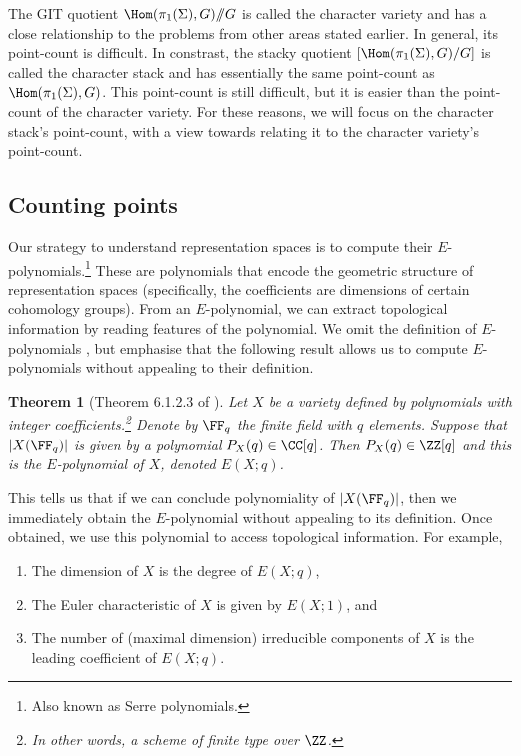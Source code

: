 \documentclass{amsart}
\theoremstyle{plain}
\newtheorem{thm}{Theorem}
\theoremstyle{definition}
\theoremstyle{remark}
\begin{document}
The GIT quotient $\Hom(\pi_1(\Sigma),G)/\!\!/G$ is called the character variety and has a close relationship to the problems from other areas stated earlier. In general, its point-count is difficult. In constrast, the stacky quotient $[\Hom(\pi_1(\Sigma),G)/G]$ is called the character stack and has essentially the same point-count as $\Hom(\pi_1(\Sigma),G)$. This point-count is still difficult, but it is easier than the point-count of the character variety. For these reasons, we will focus on the character stack's point-count, with a view towards relating it to the character variety's point-count.








\subsection*{Counting points}
Our strategy to understand representation spaces is to compute their $E$-polynomials.\footnote{Also known as Serre polynomials.} These are polynomials that encode the geometric structure of representation spaces (specifically, the coefficients are dimensions of certain cohomology groups). From an $E$-polynomial, we can extract topological information by reading features of the polynomial. We omit the definition of $E$-polynomials \cite[Definition 2.1.4]{HRV08}, but emphasise that the following result allows us to compute $E$-polynomials without appealing to their definition.
\begin{thm}[Theorem 6.1.2.3 of \cite{HRV08}]
Let $X$ be a variety defined by polynomials with integer coefficients.\footnote{In other words, a scheme of finite type over $\ZZ$.} Denote by $\FF_q$ the finite field with $q$ elements. Suppose that $|X(\FF_q)|$ is given by a polynomial $P_X(q)\in\CC[q]$. Then $P_X(q)\in\ZZ[q]$ and this is the $E$-polynomial of $X$, denoted $E(X;q)$.
\end{thm}
This tells us that if we can conclude polynomiality of $|X(\FF_q)|$, then we immediately obtain the $E$-polynomial without appealing to its definition. Once obtained, we use this polynomial to access topological information. For example,
\begin{enumerate}[\itshape(i)]
\item The dimension of $X$ is the degree of $E(X;q)$, 
\item The Euler characteristic of $X$ is given by $E(X;1)$, and
\item The number of (maximal dimension) irreducible components of $X$ is the leading coefficient of $E(X;q)$.
\end{enumerate} 
\end{document}
